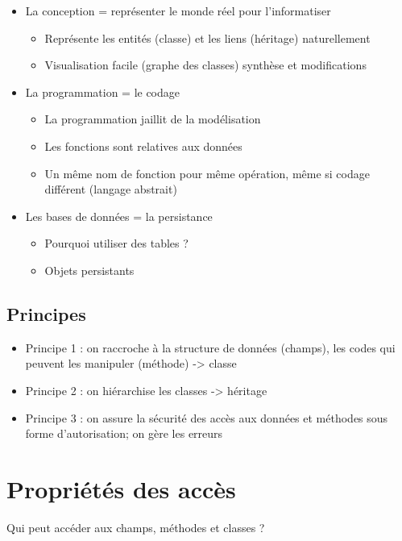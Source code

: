 \documentclass{article}
\begin{document}
\begin{itemize}
	\item La conception = représenter le monde réel pour l'informatiser
	\begin{itemize}
		\item Représente les entités (classe) et les liens (héritage) naturellement
		\item Visualisation facile (graphe des classes) synthèse et modifications
	\end{itemize}
	\item La programmation = le codage
	\begin{itemize}
		\item La programmation jaillit de la modélisation
		\item Les fonctions sont relatives aux données
		\item Un même nom de fonction pour même opération, même si codage
différent (langage abstrait)
	\end{itemize}
	\item Les bases de données = la persistance
	\begin{itemize}
		\item Pourquoi utiliser des tables ?
		\item Objets persistants
	\end{itemize}
\end{itemize}

\subsection{Principes}

\begin{itemize}
\item Principe 1 : on raccroche à la structure de données (champs),
les codes qui peuvent les manipuler (méthode) -> classe
\item Principe 2 : on hiérarchise les classes -> héritage
\item Principe 3 : on assure la sécurité des accès aux données et
méthodes sous forme d’autorisation; on gère les erreurs
\end{itemize}

\section{Propriétés des accès}
Qui peut accéder aux champs, méthodes et classes ?
\end{document}
